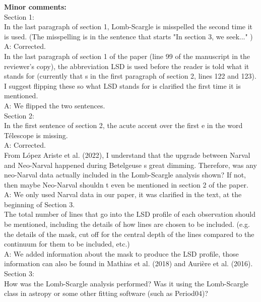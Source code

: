 \documentclass{article}
\begin{document}
\textbf{Minor comments:}\\

Section 1:\\
In the last paragraph of section 1, Lomb-Scargle is misspelled the second time it is used. (The
misspelling is in the sentence that starts "In section 3, we seek..." )\\

A: Corrected.\\

In the last paragraph of section 1 of the paper (line 99 of the manuscript in the reviewer’s copy), the abbreviation LSD is used before the reader is told what it stands for (currently that s in the first paragraph of section 2, lines 122 and 123). I suggest flipping these so what LSD stands for
is clarified the first time it is mentioned.\\

A: We flipped the two sentences.\\

Section 2:\\
In the first sentence of section 2, the acute accent over the first e in the word Télescope is missing.\\

A: Corrected.\\

From López Ariste et al. (2022), I understand that the upgrade between Narval and Neo-Narval
happened during Betelgeuse s great dimming. Therefore, was any neo-Narval data actually
included in the Lomb-Scargle analysis shown? If not, then maybe Neo-Narval shouldn t even be
mentioned in section 2 of the paper.\\

A: We only used Narval data in our paper, it was clarified in the text, at the beginning of Section 3. \\

The total number of lines that go into the LSD profile of each observation should be mentioned,
including the details of how lines are chosen to be included. (e.g. the details of the mask, cut off
for the central depth of the lines compared to the continuum for them to be included, etc.)\\

A: We added information about the mask to produce the LSD profile, those information can also be found in Mathias et al. (2018) and Aurière et al. (2016).\\

Section 3:\\
How was the Lomb-Scargle analysis performed? Was it using the Lomb-Scargle class in astropy
or some other fitting software (such as Period04)?\\
\end{document}
